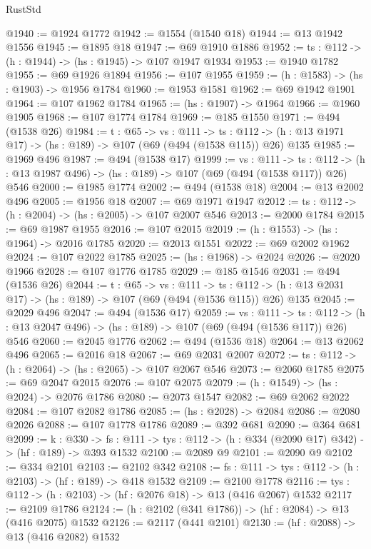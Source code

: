 \begin{lexlean}{RustStd}
\begin{coremodule}
{\begin{coremodule}
{{{{{{{{{@1940 := @1924 @1772
@1942 := @1554 (@1540 @18)
@1944 := @13 @1942 @1556
@1945 := @1895 @18
@1947 := @69 @1910 @1886
@1952 := {ts : @112} -> (h : @1944) -> (hs : @1945) -> @107 @1947 @1934
@1953 := @1940 @1782
@1955 := @69 @1926 @1894
@1956 := @107 @1955
@1959 := (h : @1583) -> (hs : @1903) -> @1956 @1784
@1960 := @1953 @1581
@1962 := @69 @1942 @1901
@1964 := @107 @1962 @1784
@1965 := (hs : @1907) -> @1964
@1966 := @1960 @1905
@1968 := @107 @1774 @1784
@1969 := @185 @1550
@1971 := @494 (@1538 @26)
@1984 := {t : @65} ->
  {vs : @111} ->
  {ts : @112} -> (h : @13 @1971 @17) -> (hs : @189) -> @107 (@69 (@494 (@1538 @115)) @26) @135
@1985 := @1969 @496
@1987 := @494 (@1538 @17)
@1999 := {vs : @111} ->
  {ts : @112} -> (h : @13 @1987 @496) -> (hs : @189) -> @107 (@69 (@494 (@1538 @117)) @26) @546
@2000 := @1985 @1774
@2002 := @494 (@1538 @18)
@2004 := @13 @2002 @496
@2005 := @1956 @18
@2007 := @69 @1971 @1947
@2012 := {ts : @112} -> (h : @2004) -> (hs : @2005) -> @107 @2007 @546
@2013 := @2000 @1784
@2015 := @69 @1987 @1955
@2016 := @107 @2015
@2019 := (h : @1553) -> (hs : @1964) -> @2016 @1785
@2020 := @2013 @1551
@2022 := @69 @2002 @1962
@2024 := @107 @2022 @1785
@2025 := (hs : @1968) -> @2024
@2026 := @2020 @1966
@2028 := @107 @1776 @1785
@2029 := @185 @1546
@2031 := @494 (@1536 @26)
@2044 := {t : @65} ->
  {vs : @111} ->
  {ts : @112} -> (h : @13 @2031 @17) -> (hs : @189) -> @107 (@69 (@494 (@1536 @115)) @26) @135
@2045 := @2029 @496
@2047 := @494 (@1536 @17)
@2059 := {vs : @111} ->
  {ts : @112} -> (h : @13 @2047 @496) -> (hs : @189) -> @107 (@69 (@494 (@1536 @117)) @26) @546
@2060 := @2045 @1776
@2062 := @494 (@1536 @18)
@2064 := @13 @2062 @496
@2065 := @2016 @18
@2067 := @69 @2031 @2007
@2072 := {ts : @112} -> (h : @2064) -> (hs : @2065) -> @107 @2067 @546
@2073 := @2060 @1785
@2075 := @69 @2047 @2015
@2076 := @107 @2075
@2079 := (h : @1549) -> (hs : @2024) -> @2076 @1786
@2080 := @2073 @1547
@2082 := @69 @2062 @2022
@2084 := @107 @2082 @1786
@2085 := (hs : @2028) -> @2084
@2086 := @2080 @2026
@2088 := @107 @1778 @1786
@2089 := @392 @681
@2090 := @364 @681
@2099 := {k : @330} ->
  {fs : @111} -> {tys : @112} -> (h : @334 (@2090 @17) @342) -> (hf : @189) -> @393 @1532
@2100 := @2089 @9
@2101 := @2090 @9
@2102 := @334 @2101
@2103 := @2102 @342
@2108 := {fs : @111} -> {tys : @112} -> (h : @2103) -> (hf : @189) -> @418 @1532
@2109 := @2100 @1778
@2116 := {tys : @112} -> (h : @2103) -> (hf : @2076 @18) -> @13 (@416 @2067) @1532
@2117 := @2109 @1786
@2124 := (h : @2102 (@341 @1786)) -> (hf : @2084) -> @13 (@416 @2075) @1532
@2126 := @2117 (@441 @2101)
@2130 := (hf : @2088) -> @13 (@416 @2082) @1532
}}}}}}}}}
\end{coremodule}}
\end{coremodule}
\end{lexlean}

